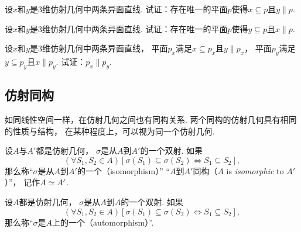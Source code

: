 \begin{example}
设\(x\)和\(y\)是3维仿射几何中两条异面直线.
试证：存在唯一的平面\(p\)使得\(x \subseteq p\)且\(y \parallel p\).
\end{example}

\begin{example}
设\(x\)和\(y\)是3维仿射几何中两条异面直线.
试证：存在唯一的平面\(p\)使得\(y \subseteq p\)且\(x \parallel p\).
\end{example}

\begin{example}
设\(x\)和\(y\)是3维仿射几何中两条异面直线，
平面\(p_x\)满足\(x \subseteq p_x\)且\(y \parallel p_x\)，
平面\(p_y\)满足\(y \subseteq p_y\)且\(x \parallel p_y\).
试证：\(p_x \parallel p_y\).
\end{example}

\subsection{仿射同构}
如同线性空间一样，在仿射几何之间也有同构关系.
两个同构的仿射几何具有相同的性质与结构，
在某种程度上，可以视为同一个仿射几何.

\begin{definition}
设\(A\)与\(A'\)都是仿射几何，
\(\sigma\)是从\(A\)到\(A'\)的一个双射.
如果\begin{equation*}
	(\forall S_1,S_2 \in A)
	[
		\sigma(S_1) \subseteq \sigma(S_2)
		\iff
		S_1 \subseteq S_2
	],
\end{equation*}
那么称“\(\sigma\)是从\(A\)到\(A'\)的一个（isomorphism）”
“\(A\)到\(A'\)同构（\(A\) is \emph{isomorphic} to \(A'\)）”，
记作\(A \simeq A'\).
\end{definition}

\begin{definition}
设\(A\)都是仿射几何，
\(\sigma\)是从\(A\)到\(A\)的一个双射.
如果\begin{equation*}
	(\forall S_1,S_2 \in A)
	[
		\sigma(S_1) \subseteq \sigma(S_2)
		\iff
		S_1 \subseteq S_2
	],
\end{equation*}
那么称“\(\sigma\)是\(A\)上的一个（automorphism）”.
\end{definition}

